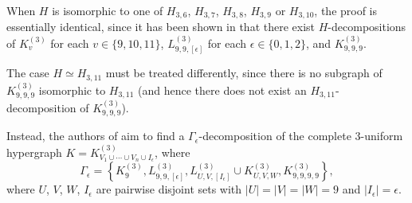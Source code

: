 
When $H$ is isomorphic to one of $H_{3,6}$, $H_{3,7}$, $H_{3,8}$, $H_{3,9}$ or $H_{3,10}$, the proof is essentially identical, since it has been shown in \cite{bryant} that there exist $H$-decompositions of $K_{v}^{(3)}$ for each $v \in \{9,10,11\}$, $L_{9,9,[\epsilon]}^{(3)}$ for each $\epsilon \in \{0,1,2\}$, and $K_{9,9,9}^{(3)}$.

The case $H \simeq H_{3,11}$ must be treated differently, since there is no subgraph of $K_{9,9,9}^{(3)}$ isomorphic to $H_{3,11}$
(and hence there does not exist an $H_{3,11}$-decomposition of $K_{9,9,9}^{(3)}$).

Instead, the authors of \cite{bryant} aim to find a $\Gamma_\epsilon$-decomposition of the complete $3$-uniform hypergraph $K = K_{V_1 \cup \cdots \cup V_n \cup I_\epsilon}^{(3)}$, where
\[
    \Gamma_\epsilon =
    \left\{ K_{9}^{(3)}, L_{9,9,[\epsilon]}^{(3)}, L_{U,V,[I_\epsilon]}^{(3)} \cup K_{U,V,W}^{(3)}, K_{9,9,9,9}^{(3)} \right\},
\]
where $U$, $V$, $W$, $I_\epsilon$ are pairwise disjoint sets with $|U| = |V| = |W| = 9$ and $|I_\epsilon| = \epsilon$.

